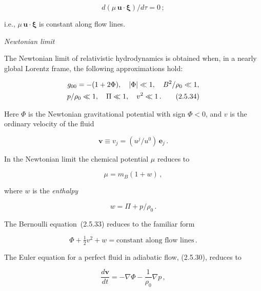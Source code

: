 \documentclass[aps,prd,twocolumn,superscriptaddress,nofootinbib]{revtex4-2}
\newcommand{\fvec}[1]{\mathbf{#1}}
\begin{document}
\begin{equation}
d(\mu\,\fvec{u}\cdot\boldsymbol{\xi})/d\tau = 0\,;
\tag{2.5.33}
\end{equation}

i.e., $\mu\,\fvec{u}\cdot\boldsymbol{\xi}$ is constant along flow lines.

\bigskip
\textit{Newtonian limit}

The Newtonian limit of relativistic hydrodynamics is obtained when, in a nearly
global Lorentz frame, the following approximations hold:

\begin{gather}
g_{00} = -(1 + 2\Phi), \quad |\Phi| \ll 1, \quad
B^2/\rho_0 \ll 1,
\notag\\
p/\rho_0 \ll 1, \quad \Pi \ll 1, \quad v^2 \ll 1\,.
\tag{2.5.34}
\end{gather}

Here $\Phi$ is the Newtonian gravitational potential with sign $\Phi < 0$, and $v$ is the
ordinary velocity of the fluid

\begin{equation}
\fvec{v} \equiv v_j = (u^j/u^0)\,\fvec{e}_j\,.
\tag{2.5.35}
\end{equation}

In the Newtonian limit the chemical potential $\mu$ reduces to

\begin{equation}
\mu = m_B(1 + w)\,,
\tag{2.5.36}
\end{equation}


where $w$ is the \textit{enthalpy}

\begin{equation}
w = \Pi + p/\rho_0\,.
\tag{2.5.37}
\end{equation}

The Bernoulli equation~(2.5.33) reduces to the familiar form

\begin{equation}
\Phi + \tfrac{1}{2}v^2 + w = \text{constant along flow lines}\,.
\tag{2.5.38}
\end{equation}

The Euler equation for a perfect fluid in adiabatic flow, (2.5.30), reduces to

\begin{equation}
\frac{d\fvec{v}}{dt} = -\nabla\Phi - \frac{1}{\rho_0}\nabla p\,,
\tag{2.5.39}
\end{equation}
\end{document}
